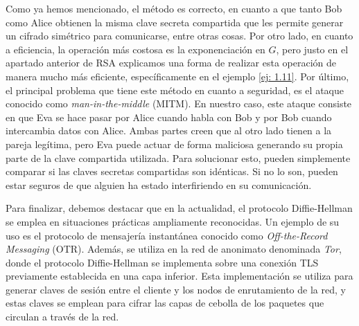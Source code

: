     \begin{observacion}
        Como ya hemos mencionado, el método es correcto, en cuanto a que tanto Bob como Alice obtienen la misma clave secreta compartida que les permite generar un cifrado simétrico para comunicarse, entre otras cosas. Por otro lado, en cuanto a eficiencia, la operación más costosa es la exponenciación en $G$, pero justo en el apartado anterior de RSA explicamos una forma de realizar esta operación de manera mucho más eficiente, específicamente en el ejemplo \ref{ej: 1.11}. Por último, el principal problema que tiene este método en cuanto a seguridad, es el ataque conocido como \textit{man-in-the-middle} (MITM). En nuestro caso, este ataque consiste en que Eva se hace pasar por Alice cuando habla con Bob y por Bob cuando intercambia datos con Alice. Ambas partes creen que al otro lado tienen a la pareja legítima, pero Eva puede actuar de forma maliciosa generando su propia parte de la clave compartida utilizada. Para solucionar esto, pueden simplemente comparar si las claves secretas compartidas son idénticas. Si no lo son, pueden estar seguros de que alguien ha estado interfiriendo en su comunicación.
    \end{observacion}

    Para finalizar, debemos destacar que en la actualidad, el protocolo Diffie-Hellman se emplea en situaciones prácticas ampliamente reconocidas. Un ejemplo de su uso es el protocolo de mensajería instantánea conocido como \textit{Off-the-Record Messaging} (OTR). Además, se utiliza en la red de anonimato denominada \textit{Tor}, donde el protocolo Diffie-Hellman se implementa sobre una conexión TLS previamente establecida en una capa inferior. Esta implementación se utiliza para generar claves de sesión entre el cliente y los nodos de enrutamiento de la red, y estas claves se emplean para cifrar las capas de cebolla de los paquetes que circulan a través de la red.
    
\endinput